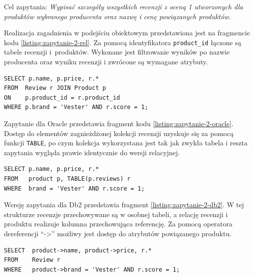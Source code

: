 \documentclass[a4paper,twoside,12pt]{book}
\begin{document}
Cel zapytania: \textit{Wypisać szczegóły wszystkich recenzji z oceną 1 utworzonych dla produktów wybranego producenta oraz nazwę i cenę powiązanych produktów}.

\vspace{0.1cm}

Realizacja zagadnienia w podejściu obiektowym przedstawiona jest na fragmencie kodu \ref{listing:zapytanie-2-rel}. Za pomocą identyfikatora \lstinline{product_id} łączone są tabele recenzji i~produktów. Wykonane jest filtrowanie wyników po nazwie producenta oraz wyniku recenzji i zwrócone są wymagane atrybuty.

\vspace{0.1cm}

\begin{lstlisting}[style=SQL, caption={Zapytanie drugie w podejściu relacyjnym.}, label={listing:zapytanie-2-rel}, captionpos=b]
SELECT p.name, p.price, r.*
FROM  Review r JOIN Product p 
ON    p.product_id = r.product_id
WHERE p.brand = 'Vester' AND r.score = 1;
\end{lstlisting}

Zapytanie dla Oracle przedstawia fragment kodu \ref{listing:zapytanie-2-oracle}. Dostęp do elementów zagnieżdżonej kolekcji recenzji uzyskuje się za pomocą funkcji \lstinline{TABLE}, po czym kolekcja wykorzystana jest tak jak zwykła tabela i reszta zapytania wygląda prawie identycznie do wersji relacyjnej. 

\vspace{0.1cm}

\begin{lstlisting}[style=SQL, caption={Zapytanie drugie w Oracle.}, label={listing:zapytanie-2-oracle}, captionpos=b]
SELECT p.name, p.price, r.*
FROM   product p, TABLE(p.reviews) r
WHERE  brand = 'Vester' AND r.score = 1;
\end{lstlisting}

Wersję zapytania dla Db2 przedstawia fragment \ref{listing:zapytanie-2-db2}. W tej strukturze recenzje przechowywane są w osobnej tabeli, a relację recenzji i produktu realizuje kolumna przechowująca referencję. Za pomocą operatora dereferencji ``->'' możliwy jest dostęp do atrybutów powiązanego produktu.

\vspace{0.1cm}

\begin{lstlisting}[style=SQL, caption={Zapytanie drugie w Db2.}, label={listing:zapytanie-2-db2}, captionpos=b]
SELECT  product->name, product->price, r.*
FROM    Review r
WHERE   product->brand = 'Vester' AND r.score = 1;
\end{lstlisting}
\end{document}
